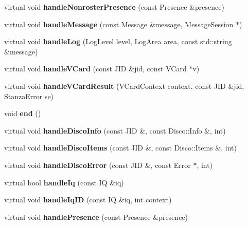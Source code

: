 \begin{DoxyCompactItemize}
\item 
\hypertarget{classBot_a601b1f75964445f9a48611186086042c}{
virtual void {\bfseries handleNonrosterPresence} (const Presence \&presence)}
\label{classBot_a601b1f75964445f9a48611186086042c}

\item 
\hypertarget{classBot_a7e6cb82c8f63c1fc3d3125752bbfe930}{
virtual void {\bfseries handleMessage} (const Message \&message, MessageSession $\ast$)}
\label{classBot_a7e6cb82c8f63c1fc3d3125752bbfe930}

\item 
\hypertarget{classBot_a10e94a2ac1ce8db98ce89c61375611b8}{
virtual void {\bfseries handleLog} (LogLevel level, LogArea area, const std::string \&message)}
\label{classBot_a10e94a2ac1ce8db98ce89c61375611b8}

\item 
\hypertarget{classBot_ae5c375106d9733bfe780edde4f016d87}{
virtual void {\bfseries handleVCard} (const JID \&jid, const VCard $\ast$v)}
\label{classBot_ae5c375106d9733bfe780edde4f016d87}

\item 
\hypertarget{classBot_ad643fdd35a8060ce4b09228f12597cb3}{
virtual void {\bfseries handleVCardResult} (VCardContext context, const JID \&jid, StanzaError se)}
\label{classBot_ad643fdd35a8060ce4b09228f12597cb3}

\item 
\hypertarget{classBot_acb923ca8286b780365c7f24a0c074abf}{
void {\bfseries end} ()}
\label{classBot_acb923ca8286b780365c7f24a0c074abf}

\item 
\hypertarget{classBot_a0a11810f509b0113f57835ab74ae10c6}{
virtual void {\bfseries handleDiscoInfo} (const JID \&, const Disco::Info \&, int)}
\label{classBot_a0a11810f509b0113f57835ab74ae10c6}

\item 
\hypertarget{classBot_aa7c7e69464b2878a5319ed89492f9aa5}{
virtual void {\bfseries handleDiscoItems} (const JID \&, const Disco::Items \&, int)}
\label{classBot_aa7c7e69464b2878a5319ed89492f9aa5}

\item 
\hypertarget{classBot_a800f81d6e8a1788343818277ad54fbbf}{
virtual void {\bfseries handleDiscoError} (const JID \&, const Error $\ast$, int)}
\label{classBot_a800f81d6e8a1788343818277ad54fbbf}

\item 
\hypertarget{classBot_a2eae5769db23d4a333a26ee166e64da0}{
virtual bool {\bfseries handleIq} (const IQ \&iq)}
\label{classBot_a2eae5769db23d4a333a26ee166e64da0}

\item 
\hypertarget{classBot_a5900106dac0370335e46b9363707f8c5}{
virtual void {\bfseries handleIqID} (const IQ \&iq, int context)}
\label{classBot_a5900106dac0370335e46b9363707f8c5}

\item 
\hypertarget{classBot_a9b4c7098db22a7c8f77ef975f7374a18}{
virtual void {\bfseries handlePresence} (const Presence \&presence)}
\label{classBot_a9b4c7098db22a7c8f77ef975f7374a18}

\end{DoxyCompactItemize}
